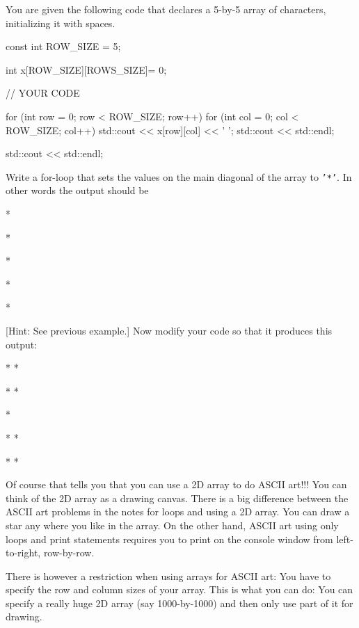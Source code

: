 \begin{ex}
You are given the following code that declares a 5-by-5 array of characters, initializing it with spaces.
  
\begin{consolethree}
const int ROW_SIZE = 5;

int x[ROW_SIZE][ROWS_SIZE]= {{0}};

// YOUR CODE

for (int row = 0; row < ROW_SIZE; row++)
{
     for (int col = 0; col < ROW_SIZE; col++)
     {
       std::cout << x[row][col]  << ' ';
     }
     std::cout << std::endl;
}

std::cout << std::endl; 
\end{consolethree}

Write a for-loop that sets the values on the main diagonal of the array
to \texttt{'*'}. In other words the output
should be

\begin{consolethree}
*

*

*

*

*
\end{consolethree}

[Hint: See previous example.] Now modify your code so that it
produces this output:

\begin{consolethree}
* *

* *

*

* *

* * 
\end{consolethree}

Of course that tells you that you can use a 2D array to do ASCII art!!! You can think of the 2D array as a drawing canvas. There is a big difference between the ASCII art problems in the notes for loops and using a 2D array. You can draw a star any where you like in the array. On the other hand, ASCII art using only loops and print statements requires you to print on the console window from left-to-right, row-by-row.

There is however a restriction when using arrays for ASCII art: You have to specify the row and column sizes of your array. This is what you can do: You can specify a really huge 2D array (say 1000-by-1000) and then only use part of it for drawing.



\end{ex}
